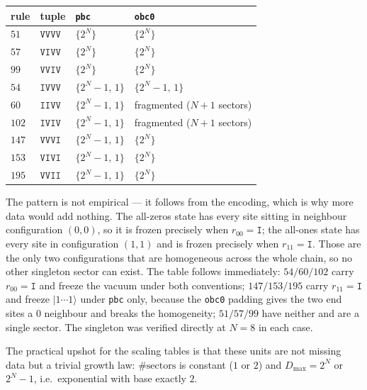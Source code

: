 \documentclass[11pt]{article}
\newcommand{\rt}[1]{\texttt{#1}}
\providecommand{\ket}[1]{|#1\rangle}
\begin{document}
\begin{center}\small
\begin{tabular}{llll}
\toprule
rule & tuple & \rt{pbc} & \rt{obc0}\\
\midrule
$51$  & $\rt{VVVV}$ & $\{2^N\}$ & $\{2^N\}$\\
$57$  & $\rt{VIVV}$ & $\{2^N\}$ & $\{2^N\}$\\
$99$  & $\rt{VVIV}$ & $\{2^N\}$ & $\{2^N\}$\\
$54$  & $\rt{IVVV}$ & $\{2^N\!-\!1,\,1\}$ & $\{2^N\!-\!1,\,1\}$\\
$60$  & $\rt{IIVV}$ & $\{2^N\!-\!1,\,1\}$ & fragmented ($N+1$ sectors)\\
$102$ & $\rt{IVIV}$ & $\{2^N\!-\!1,\,1\}$ & fragmented ($N+1$ sectors)\\
$147$ & $\rt{VVVI}$ & $\{2^N\!-\!1,\,1\}$ & $\{2^N\}$\\
$153$ & $\rt{VIVI}$ & $\{2^N\!-\!1,\,1\}$ & $\{2^N\}$\\
$195$ & $\rt{VVII}$ & $\{2^N\!-\!1,\,1\}$ & $\{2^N\}$\\
\bottomrule
\end{tabular}
\end{center}

The pattern is not empirical --- it follows from the encoding, which is why more
data would add nothing. The all-zeros state has every site sitting in neighbour
configuration $(0,0)$, so it is frozen precisely when $r_{00}=\rt I$; the
all-ones state has every site in configuration $(1,1)$ and is frozen precisely
when $r_{11}=\rt I$. Those are the only two configurations that are homogeneous
across the whole chain, so no other singleton sector can exist. The table follows
immediately: $54/60/102$ carry $r_{00}=\rt I$ and freeze the vacuum under both
conventions; $147/153/195$ carry $r_{11}=\rt I$ and freeze $\ket{1\cdots1}$ under
\rt{pbc} only, because the \rt{obc0} padding gives the two end sites a $0$
neighbour and breaks the homogeneity; $51/57/99$ have neither and are a single
sector. The singleton was verified directly at $N=8$ in each case.

The practical upshot for the scaling tables is that these units are not missing
data but a trivial growth law: $\#\text{sectors}$ is constant ($1$ or $2$) and
$D_{\max}=2^N$ or $2^N-1$, i.e.\ exponential with base exactly $2$.
\end{document}
